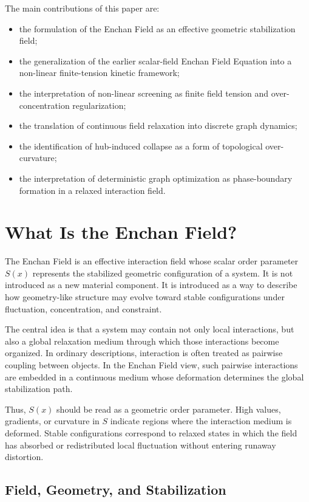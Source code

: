 \documentclass[11pt,a4paper]{article}
\begin{document}
The main contributions of this paper are:
\begin{itemize}
    \item the formulation of the Enchan Field as an effective geometric stabilization field;
    \item the generalization of the earlier scalar-field Enchan Field Equation into a non-linear finite-tension kinetic framework;
    \item the interpretation of non-linear screening as finite field tension and over-concentration regularization;
    \item the translation of continuous field relaxation into discrete graph dynamics;
    \item the identification of hub-induced collapse as a form of topological over-curvature;
    \item the interpretation of deterministic graph optimization as phase-boundary formation in a relaxed interaction field.
\end{itemize}

\clearpage

\section{What Is the Enchan Field?}

The Enchan Field is an effective interaction field whose scalar order parameter $S(x)$ represents the stabilized geometric configuration of a system. It is not introduced as a new material component. It is introduced as a way to describe how geometry-like structure may evolve toward stable configurations under fluctuation, concentration, and constraint.

The central idea is that a system may contain not only local interactions, but also a global relaxation medium through which those interactions become organized. In ordinary descriptions, interaction is often treated as pairwise coupling between objects. In the Enchan Field view, such pairwise interactions are embedded in a continuous medium whose deformation determines the global stabilization path.

Thus, $S(x)$ should be read as a geometric order parameter. High values, gradients, or curvature in $S$ indicate regions where the interaction medium is deformed. Stable configurations correspond to relaxed states in which the field has absorbed or redistributed local fluctuation without entering runaway distortion.

\subsection{Field, Geometry, and Stabilization}
\end{document}

